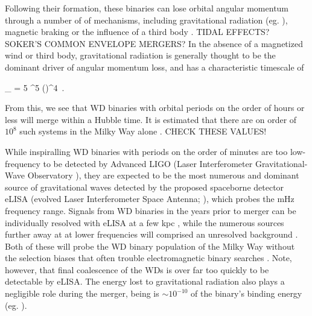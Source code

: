 Following their formation, these binaries can lose orbital angular momentum through a number of of mechanisms, including gravitational radiation (eg. \citealt{XXX}), magnetic braking \citep{XXX} or the influence of a third body \citep{XXX}.  {\charles TIDAL EFFECTS?  SOKER'S COMMON ENVELOPE MERGERS?}  In the absence of a magnetized wind or third body, gravitational radiation is generally thought to be the dominant driver of angular momentum loss, and has a characteristic timescale of \citep{segrcm97}

\eqbegin
\tau_{} = 5 ^5 \left(\right)^4 \frac{\Msun}{\Ma} \frac{\Msun}{\Md} \frac{\Msun}{\Mtot}\,.
\label{eq:c1_gravtimescale}
\eqend

\noindent From this, we see that WD binaries with orbital periods on the order of hours or less will merge within a Hubble time.  It is estimated that there are on order of $10^8$ such systems in the Milky Way alone \citep{nele+01a,mars11}.  {\charles CHECK THESE VALUES!}

While inspiralling WD binaries with periods on the order of minutes are too low-frequency to be detected by Advanced LIGO (Laser Interferometer Gravitational-Wave Observatory \citealt{ligo+15}), they are expected to be the most numerous and dominant source of gravitational waves \citep{mars11} detected by the proposed spaceborne detector eLISA (evolved Laser Interferometer Space Antenna; \citealt{amar+13}), which probes the mHz frequency range.  Signals from WD binaries in the years prior to merger can be individually resolved with eLISA at a few kpc \citep{loreig09, dan+11}, while the numerous sources further away at at lower frequencies will comprised an unresolved background \cite{neleyp01,amar+13}.  Both of these will probe the WD binary population of the Milky Way without the selection biases that often trouble electromagnetic binary searches \citep{mars11}.  {\charles Note, however, that final coalescence of the WDs is over far too quickly to be detectable by eLISA.}  The energy lost to gravitational radiation also plays a negligible role during the merger, being is $\sim10^{-10}$ of the binary's binding energy (eg. \citealt{loreig09}).

